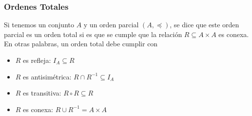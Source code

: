 \documentclass[../main.tex]{subfiles}
\begin{document}
\subsubsection{Ordenes Totales}
Si tenemos un conjunto $A$ y un orden parcial $(A, \preceq)$, se dice que este orden parcial es un orden total si es que se cumple que la relación $R \subseteq A \times A$ es conexa. En otras palabras, un orden total debe cumplir con
\begin{itemize}
    \item $R$ es refleja: $I_A \subseteq R$
    \item $R$ es antisimétrica: $R \cap R^{-1} \subseteq I_A$
    \item $R$ es transitiva: $R \circ R \subseteq R$
    \item $R$ es conexa: $R \cup R^{-1} = A \times A$
\end{itemize}
\end{document}
